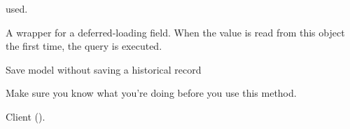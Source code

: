 \documentclass[letterpaper,10pt,english]{sphinxmanual}
\begin{document}
\begin{fulllineitems}
\begin{fulllineitems}
\end{fulllineitems}


\begin{fulllineitems}
\label{\detokenize{modules/models:users.models.CotisationHistory.paymentMethod}}
{\hyperref[\detokenize{modules/models:preferences.models.PaymentMethod}]{}} used.

\end{fulllineitems}


\begin{fulllineitems}
\label{\detokenize{modules/models:users.models.CotisationHistory.paymentMethod_id}}
A wrapper for a deferred-loading field. When the value is read from this
object the first time, the query is executed.

\end{fulllineitems}


\begin{fulllineitems}
\label{\detokenize{modules/models:users.models.CotisationHistory.save_without_historical_record}}
Save model without saving a historical record

Make sure you know what you’re doing before you use this method.

\end{fulllineitems}


\begin{fulllineitems}
\label{\detokenize{modules/models:users.models.CotisationHistory.user}}
Client ().


\end{fulllineitems}
\end{fulllineitems}
\end{document}
